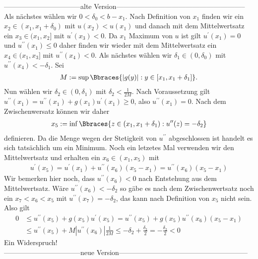 \begin{solution}
\begin{enumerate}[label = (\roman*)]
    ---------------------------------alte Version--------------------------------------------------------\\
		Als nächstes wählen wir $0 < \delta_0 < b - x_1$. Nach Definition von $x_1$ finden wir ein $x_2 \in (x_1,x_1 + \delta_0)$ mit $u(x_2) < u(x_1)$ und danach mit dem Mittelwertsatz ein $x_3 \in (x_1, x_2]$ mit $u^\prime(x_3) < 0$. Da $x_1$ Maximum von $u$ ist gilt $u^\prime(x_1) = 0$ und $u^{\prime\prime}(x_1) \leq 0$ daher finden wir wieder mit dem Mittelwertsatz ein $x_4 \in (x_1, x_3]$ mit $u^{\prime\prime}(x_4) < 0$. Als nächstes wählen wir $\delta_1 \in (0, \delta_0)$ mit $u^{\prime\prime}(x_4) < - \delta_1$.  Sei
		\begin{align*}
		M := \sup\Bbraces{|g(y)|: y \in [x_1,x_1 + \delta_1]}.
		\end{align*}
		Nun wählen wir $\delta_2 \in (0, \delta_1)$ mit $\delta_2 < \frac{1}{2M}$. Nach Voraussetzung gilt $u^{\prime\prime}(x_1) = u^{\prime\prime}(x_1) + g(x_1) u^\prime(x_1) \geq 0$, also $u^{\prime\prime}(x_1) = 0$. Nach dem Zwischenwersatz können wir daher
		\begin{align*}
		x_5 := \inf\Bbraces{z \in (x_1, x_1 + \delta_1): u^{\prime\prime}(z) = -\delta_2}
		\end{align*}
		definieren. Da die Menge wegen der Stetigkeit von $u^{\prime\prime}$ abgeschlossen ist handelt es sich tatsächlich um ein Minimum. Noch ein letzetes Mal verwenden wir den Mittelwertsatz und erhalten ein $x_6 \in (x_1, x_5)$ mit
		\begin{align*}
		u^\prime(x_5) = u^\prime(x_1) + u^{\prime\prime}(x_6) (x_5 - x_1) = u^{\prime\prime}(x_6) (x_5 - x_1)
		\end{align*}
		Wir bemerken hier noch, dass $u^{\prime\prime}(x_6) < 0$ nach Entstehung aus dem Mittelwertsatz. Wäre $u^{\prime\prime}(x_6) < -\delta_2$ so gäbe es nach dem Zwischenwertsatz noch ein $x_7 < x_6 < x_5$ mit $u^{\prime\prime}(x_7) = -\delta_2$, das kann nach Definition von $x_5$ nicht sein. Also gilt
		\begin{align*}
		0 &\leq u^{\prime\prime}(x_5) + g(x_5) u^\prime (x_5) = u^{\prime\prime}(x_5) + g(x_5) u^{\prime\prime}(x_6)(x_5 - x_1) \\
		&\leq u^{\prime\prime}(x_5) + M |u^{\prime\prime}(x_6)| \frac{1}{2M} \leq -\delta_2 + \frac{\delta_2}{2} = -\frac{\delta_2}{2} < 0
		\end{align*}
		Ein Widerspruch!\\
    ---------------------------------neue Version--------------------------------------------------------\\

\end{enumerate}
\end{solution}
